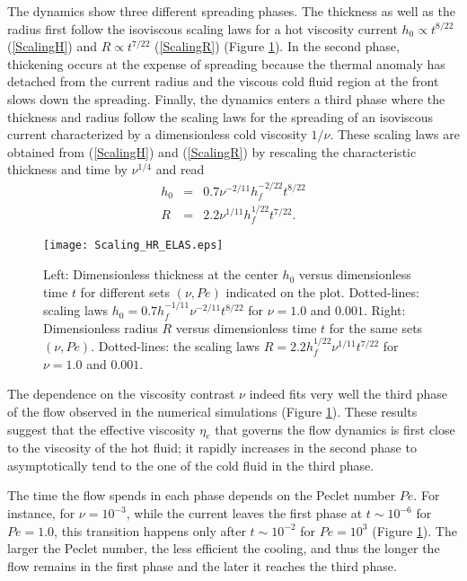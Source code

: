 The dynamics show three different  spreading phases.  The thickness as
well as the radius first follow  the isoviscous scaling laws for a hot
viscosity   current   $h_0\propto   t^{8/22}$   (\ref{ScalingH})   and
$R\propto  t^{7/22}$ (\ref{ScalingR})  (Figure \ref{Scaling_HR_ELAS}).
In the  second phase,  thickening occurs at  the expense  of spreading
because the thermal  anomaly has detached from the  current radius and
the viscous cold fluid region at the front slows down the spreading.
Finally, the  dynamics enters  a third phase  where the  thickness and
radius  follow the  scaling laws  for the  spreading of  an isoviscous
current characterized by a dimensionless cold viscosity $1/\nu$. These
scaling laws  are obtained from (\ref{ScalingH})  and (\ref{ScalingR})
by rescaling the characteristic thickness and time by $\nu^{1/4}$ and
read
\begin{eqnarray}
  h_{0} & = &0.7 \nu^{-2/11} h_f^{-2/22}t^{8/22}\label{ScalingH-Visco}\\
  R& = & 2.2 \nu^{1/11}h_f^{1/22} t^{7/22}\label{ScalingR-Visco}.
\end{eqnarray}
\begin{figure}
  \begin{center}
    \graphicspath{ {/Users/thorey/Documents/These/Projet/Refroidissement/Skin_Model/Figure/JFM_V13/} }
    \texttt{[image: Scaling\_HR\_ELAS.eps]}
    \caption{Left: Dimensionless thickness at  the center $h_0$ versus
      dimensionless time  $t$ for different sets  $(\nu,Pe)$ indicated
      on      the      plot.      Dotted-lines:      scaling      laws
      $h_0=  0.7h_f^{-1/11}\nu^{-2/11}t^{8/22}$ for  $\nu  = 1.0$  and
      $0.001$.  Right:  Dimensionless radius $R$  versus dimensionless
      time  $t$  for  the  same sets  $(\nu,Pe)$.   Dotted-lines:  the
      scaling    laws    $R=   2.2h_f^{1/22}\nu^{1/11}t^{7/22}$    for
      $\nu = 1.0$ and $0.001$.}
    \label{Scaling_HR_ELAS}
  \end{center}
\end{figure}
The dependence on  the viscosity contrast $\nu$ indeed  fits very well
the  third phase  of the  flow observed  in the  numerical simulations
(Figure  \ref{Scaling_HR_ELAS}).   These   results  suggest  that  the
effective viscosity $\eta_e$  that governs the flow  dynamics is first
close to the  viscosity of the hot fluid; it  rapidly increases in the
second phase  to asymptotically tend to  the one of the  cold fluid in
the third phase.

The time  the flow spends in  each phase depends on  the Peclet number
$Pe$.  For instance,  for $\nu=10^{-3}$, while the  current leaves the
first phase at $t \sim 10^{-6}$ for $Pe =1.0$, this transition happens
only   after   $t   \sim   10^{-2}$    for   $Pe   =   10^3$   (Figure
\ref{Scaling_HR_ELAS}).  The  larger  the   Peclet  number,  the  less
efficient the  cooling, and thus  the longer  the flow remains  in the
first  phase  and the  later  it  reaches  the  third phase.

